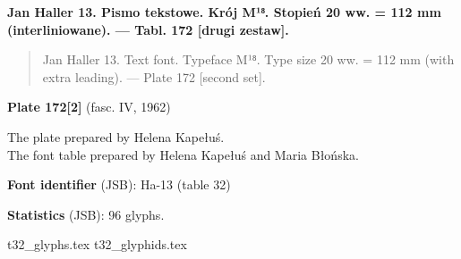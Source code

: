 \documentclass[12pt]{article}
\newcommand{\bg}{\begingl}
\newcommand{\pismoPL}[1]{{\relsize{2}\Junicode\textbf{#1}}}
\newcommand{\pismoEN}[1]{{\relsize{1}\Junicode\begin{quote}#1\end{quote}}}
\newcommand{\plate}[3]{\textbf{Plate #1} (fasc. #2, #3)}
\newcommand{\exampleDig}[1]{{\relsize{0}\Junicode \textbf{Digitization(s) [JSB]:} #1}}
\newcommand{\examplePL}[1]{}
\newcommand{\exampleEN}[1]{}
\newcommand{\fontID}[2]{{\relsize{1}\Junicode\textbf{Font identifier} (JSB): #1 (table #2)}}
\newcommand{\fontstat}[1]{{\relsize{1}\Junicode\textbf{Statistics} (JSB): #1 glyphs.}}
\newcommand{\exampleRef}[1]{{\relsize{0}\Junicode \textbf{References:} #1}}
\begin{document}







  

 \newpage



  \pismoPL{Jan Haller 13.  Pismo tekstowe. Krój M¹⁸. Stopień 20 ww. = 112 mm (interliniowane). — Tabl. 172 [drugi zestaw].}
  
  \pismoEN{Jan Haller 13. Text font. Typeface M¹⁸. Type size 20 ww. =
    112 mm (with extra leading). — Plate 172 [second set].}

\plate{172[2]}{IV}{1962}

The plate prepared by Helena Kapełuś.\\
The font table prepared by Helena Kapełuś and Maria Błońska.


\examplePL{Pismo 13: drugi zestaw. — Cyfry 9: z pismem 13.}

    \medskip

    \exampleEN{Font 13. — second character set,  — Digits 9: with font 13.}


\bigskip


\fontID{Ha-13}{32}

\fontstat{96}

  {t32_glyphs.tex}
  {t32_glyphids.tex}
\end{document}
